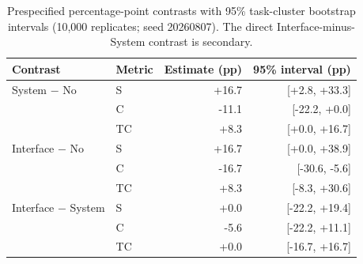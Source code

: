 \begin{table}[t]
\caption{Prespecified percentage-point contrasts with 95\% task-cluster bootstrap intervals (10{,}000 replicates; seed 20260807). The direct Interface-minus-System contrast is secondary.}
\label{tab:v02-contrasts-supp}
\centering
\small
\setlength{\tabcolsep}{4pt}
\begin{tabular}{llrr}
\toprule
Contrast & Metric & Estimate (pp) & 95\% interval (pp) \\
\midrule
System $-$ No & S & +16.7 & [+2.8, +33.3] \\
 & C & -11.1 & [-22.2, +0.0] \\
 & TC & +8.3 & [+0.0, +16.7] \\
\addlinespace[2pt]
Interface $-$ No & S & +16.7 & [+0.0, +38.9] \\
 & C & -16.7 & [-30.6, -5.6] \\
 & TC & +8.3 & [-8.3, +30.6] \\
\addlinespace[2pt]
Interface $-$ System & S & +0.0 & [-22.2, +19.4] \\
 & C & -5.6 & [-22.2, +11.1] \\
 & TC & +0.0 & [-16.7, +16.7] \\
\bottomrule
\end{tabular}
\end{table}
